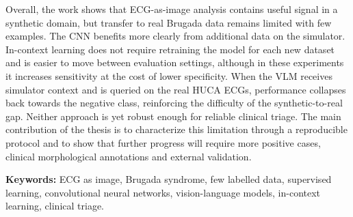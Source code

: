 Overall, the work shows that ECG-as-image analysis contains useful signal in a synthetic domain, but transfer to real Brugada data remains limited with few examples. The CNN benefits more clearly from additional data on the simulator. In-context learning does not require retraining the model for each new dataset and is easier to move between evaluation settings, although in these experiments it increases sensitivity at the cost of lower specificity. When the VLM receives simulator context and is queried on the real HUCA ECGs, performance collapses back towards the negative class, reinforcing the difficulty of the synthetic-to-real gap. Neither approach is yet robust enough for reliable clinical triage. The main contribution of the thesis is to characterize this limitation through a reproducible protocol and to show that further progress will require more positive cases, clinical morphological annotations and external validation.

\textbf{Keywords:} ECG as image, Brugada syndrome, few labelled data, supervised learning, convolutional neural networks, vision-language models, in-context learning, clinical triage.
